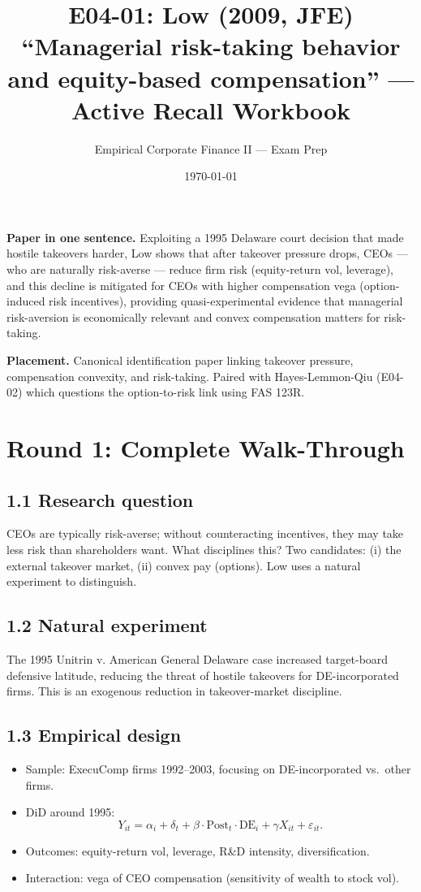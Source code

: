 \documentclass[11pt]{article}
\title{E04-01: Low (2009, JFE) \\
\large ``Managerial risk-taking behavior and equity-based compensation'' --- Active Recall Workbook}
\author{Empirical Corporate Finance II --- Exam Prep}
\date{\today}
\begin{document}
\maketitle

\begin{keybox}
\textbf{Paper in one sentence.} Exploiting a 1995 Delaware court decision that made hostile takeovers harder, Low shows that after takeover pressure drops, CEOs --- who are naturally risk-averse --- reduce firm risk (equity-return vol, leverage), and this decline is mitigated for CEOs with higher compensation vega (option-induced risk incentives), providing quasi-experimental evidence that managerial risk-aversion is economically relevant and convex compensation matters for risk-taking.

\textbf{Placement.} Canonical identification paper linking takeover pressure, compensation convexity, and risk-taking. Paired with Hayes-Lemmon-Qiu (E04-02) which questions the option-to-risk link using FAS 123R.
\end{keybox}

\section*{Round 1: Complete Walk-Through}

\subsection*{1.1 Research question}
CEOs are typically risk-averse; without counteracting incentives, they may take less risk than shareholders want. What disciplines this? Two candidates: (i) the external takeover market, (ii) convex pay (options). Low uses a natural experiment to distinguish.

\subsection*{1.2 Natural experiment}
The 1995 Unitrin v. American General Delaware case increased target-board defensive latitude, reducing the threat of hostile takeovers for DE-incorporated firms. This is an exogenous reduction in takeover-market discipline.

\subsection*{1.3 Empirical design}
\begin{itemize}
\item Sample: ExecuComp firms 1992--2003, focusing on DE-incorporated vs.\ other firms.
\item DiD around 1995:
\[
Y_{it}=\alpha_i+\delta_t+\beta\cdot\text{Post}_t\cdot \text{DE}_i+\gamma X_{it}+\varepsilon_{it}.
\]
\item Outcomes: equity-return vol, leverage, R\&D intensity, diversification.
\item Interaction: vega of CEO compensation (sensitivity of wealth to stock vol).
\end{itemize}
\end{document}
